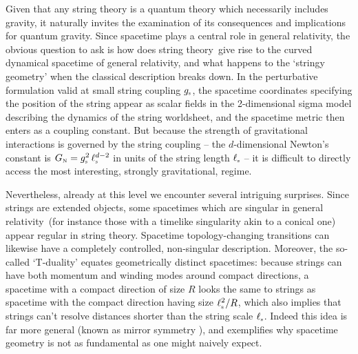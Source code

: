 \documentclass[12pt,a4paper]{article}
\def\GR{general relativity}
\def\STY{string theory}
\def\QG{quantum gravity}
\def\gst{g_{\scriptscriptstyle {\rm s}}}
\def\GN{G_{\scriptscriptstyle {\rm N}}}
\def\lst{\ell_{\scriptscriptstyle {\rm s}}}
\begin{document}
Given that any string theory is a quantum theory which necessarily includes gravity, it naturally invites the examination of its consequences and implications for \QG.  Since spacetime plays a central role in \GR, the obvious question to ask is how does \STY\ give rise to the curved dynamical spacetime of \GR,  and what happens to the `stringy geometry' when the classical description breaks down.  
In the perturbative formulation valid at small string coupling $\gst$, 
 the spacetime coordinates specifying the position of the string appear as scalar fields in the 2-dimensional sigma model describing the dynamics of the string worldsheet, and
the spacetime metric then enters as a coupling constant.
But because the strength of gravitational interactions is governed by the string coupling -- the $d$-dimensional Newton's constant is $\GN = \gst^2 \, \lst^{d-2}$  in units of the string length $\lst$ --  it is difficult to directly access the most interesting, strongly gravitational, regime.  

Nevertheless, already at this level we encounter several intriguing surprises.  Since strings are extended objects, some spacetimes which are singular in \GR\ (for instance those with a timelike singularity akin to a conical one) appear regular in \STY.  Spacetime topology-changing transitions can likewise have a completely controlled, non-singular description.  Moreover, the so-called `T-duality' equates geometrically distinct spacetimes: because strings can have both momentum and winding modes around compact directions, a spacetime with a compact direction of size $R$ looks the same to strings as spacetime with the compact direction having size $\lst^2 / R$, which also implies that strings can't resolve distances shorter than the string scale $\lst$.  Indeed this idea is far more general  (known as mirror symmetry \cite{Greene:1991iv}), and exemplifies why spacetime geometry is not as fundamental as one might naively expect.
\end{document}
